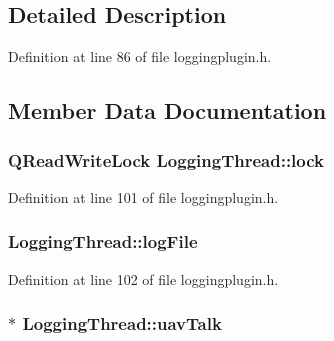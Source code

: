 \subsection{\-Detailed \-Description}


\-Definition at line 86 of file loggingplugin.\-h.



\subsection{\-Member \-Data \-Documentation}
\hypertarget{class_logging_thread_a1785d83bc4ce0953c423e8ac27d7cebb}{
\subsubsection[{lock}]{\setlength{\rightskip}{0pt plus 5cm}\-Q\-Read\-Write\-Lock {\bf \-Logging\-Thread\-::lock}}}\label{class_logging_thread_a1785d83bc4ce0953c423e8ac27d7cebb}


\-Definition at line 101 of file loggingplugin.\-h.

\hypertarget{class_logging_thread_ab940b3322d9c974b3d3630b9509ef4bb}{
\subsubsection[{log\-File}]{ {\bf \-Logging\-Thread\-::log\-File}}}\label{class_logging_thread_ab940b3322d9c974b3d3630b9509ef4bb}


\-Definition at line 102 of file loggingplugin.\-h.

\hypertarget{class_logging_thread_a0dfed803383ab861a16c748421396306}{
\subsubsection[{uav\-Talk}]{$\ast$ {\bf \-Logging\-Thread\-::uav\-Talk}}}\label{class_logging_thread_a0dfed803383ab861a16c748421396306}


